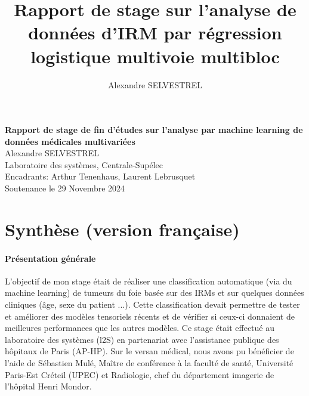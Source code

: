 \documentclass[preprint,12pt]{elsarticle}
\begin{document}
\title{Rapport de stage sur l'analyse de données d'IRM par régression logistique multivoie multibloc} %


\author{Alexandre SELVESTREL} %


            \begin{center}
              \vspace*{4cm}
              {\LARGE \textbf{Rapport de stage de fin d'études sur l'analyse par machine learning de données médicales multivariées}} \\[5em]
              {\large Alexandre SELVESTREL}\\[1em]
              {\large Laboratoire des systèmes, Centrale-Supélec}\\[1em]
              {\large Encadrants: Arthur Tenenhaus, Laurent Lebrusquet}\\
              \vspace*{\fill}
              Soutenance le 29 Novembre 2024
          \end{center}

\newpage

\section*{Synthèse (version française)}
\paragraph*{Présentation générale} L'objectif de mon stage était de réaliser une classification automatique (via du machine learning) de tumeurs du foie basée sur des IRMs et sur quelques données cliniques (âge, sexe du patient ...). Cette classification devait permettre de tester et améliorer des modèles tensoriels récents \cite{multi_rank_1,multi_rank_r} et de vérifier si ceux-ci donnaient de meilleures performances que les autres modèles. Ce stage était effectué au laboratoire des systèmes (l2S) en partenariat avec l'assistance publique des hôpitaux de Paris (AP-HP). Sur le versan médical, nous avons pu bénéficier de l'aide de Sébastien Mulé, Maître de conférence à la faculté de santé, Université Paris-Est Créteil (UPEC) et Radiologie, chef du département imagerie de l'hôpital Henri Mondor.
\end{document}
